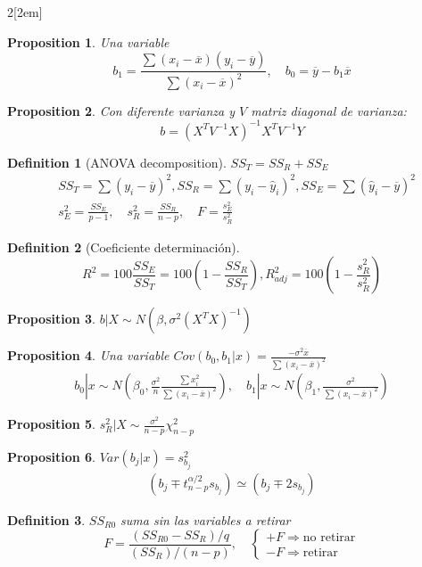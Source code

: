 \documentclass[leqno]{article}
\newtheorem*{proposition}{Proposition}
\newtheorem*{definition}{Definition}
\begin{document}
\begin{multicols}{2}[\columnsep2em]
\begin{proposition} Una variable
\[
b_1 = \frac{\sum (x_i-\overline{x})(y_i-\overline{y})}{\sum (x_i-\overline{x})^2}, \quad b_0 = \overline{y} - b_1 \overline{x}
\]  
\end{proposition}

\begin{proposition} Con diferente varianza y $V$ matriz diagonal de varianza:
\[
b = (X^TV^{-1}X)^{-1}X^TV^{-1}Y
\] 
\end{proposition}

\begin{definition}[ANOVA decomposition] $SS_T = SS_R + SS_E$
  \begin{align*}
  & SS_T = \sum (y_i - \overline{y})^2, SS_R = \sum (y_i-\hat{y}_i)^2, SS_E = \sum (\hat{y}_i-\overline{y})^2 \\
  & s_E^2 = \frac{SS_E}{p-1}, \quad s_R^2 = \frac{SS_R}{n-p}, \quad F = \frac{s_E^2}{s_R^2}
  \end{align*}
\end{definition}

\begin{definition}[Coeficiente determinación]
  \[
  R^2 = 100 \frac{SS_E}{SS_T} = 100(1-\frac{SS_R}{SS_T}), R_{adj}^2 = 100(1- \frac{s_R^2}{s_R^2}) 
  \] 
\end{definition}

\begin{proposition} $b|X \sim N(\beta , \sigma^2(X^TX)^{-1})$
\end{proposition}

\begin{proposition} Una variable $Cov(b_0, b_1|x) = \frac{-\sigma ^2 \overline{x}}{\sum (x_i- \overline{x})^2}$
\begin{align*}
  b_0|x \sim  N(\beta_0, \frac{\sigma ^2}{n} \frac{\sum x_i^2}{\sum (x_i- \overline{x})^2}), \quad
  b_1|x \sim  N(\beta_1, \frac{\sigma ^2}{\sum (x_i- \overline{x})^2})
\end{align*} 
\end{proposition}

\begin{proposition} $s_R^2 |X \sim \frac{\sigma^2 }{n-p}\chi ^2_{n-p}$ 
\end{proposition}

\begin{proposition} $Var(b_j|x) = s_{b_j}^2$ 
  \begin{align*}
	(b_j \mp t_{n-p}^{\alpha / 2} s_{b_j}) \simeq  (b_j \mp 2 s_{b_j})
  \end{align*}
\end{proposition}

\begin{definition} $SS_{R0}$ suma sin las variables a retirar
\[
F = \frac{ (SS_{R0}-SS_R) / q}{ (SS_R) / (n-p)}, \quad \begin{cases}
  + F \Rightarrow \text{no retirar} \\
  -F \Rightarrow \text{retirar}
\end{cases}
\] 
\end{definition}



\end{multicols}
\end{document}
